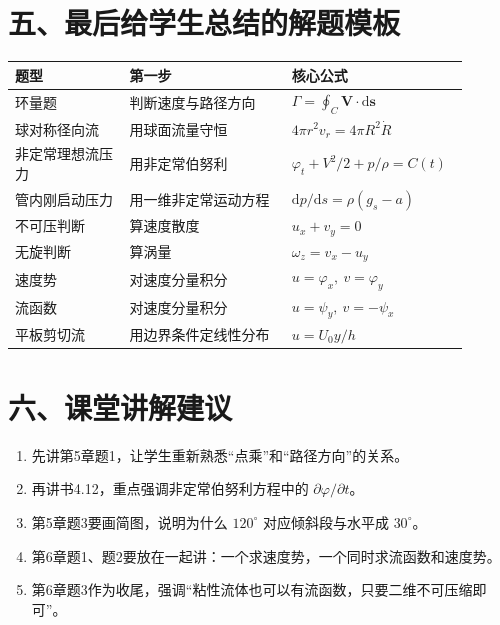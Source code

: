 ﻿\documentclass[12pt,a4paper]{ctexart}
\newcommand{\dd}{\mathrm d}
\begin{document}
\section*{五、最后给学生总结的解题模板}

\begin{center}
\begin{tabular}{p{0.24\linewidth}p{0.34\linewidth}p{0.32\linewidth}}
\toprule
题型 & 第一步 & 核心公式 \\
\midrule
环量题 & 判断速度与路径方向 & $\Gamma=\oint_C\bm V\cdot\dd\bm s$ \\
球对称径向流 & 用球面流量守恒 & $4\pi r^2v_r=4\pi R^2\dot R$ \\
非定常理想流压力 & 用非定常伯努利 & $\varphi_t+V^2/2+p/\rho=C(t)$ \\
管内刚启动压力 & 用一维非定常运动方程 & $\dd p/\dd s=\rho(g_s-a)$ \\
不可压判断 & 算速度散度 & $u_x+v_y=0$ \\
无旋判断 & 算涡量 & $\omega_z=v_x-u_y$ \\
速度势 & 对速度分量积分 & $u=\varphi_x,\ v=\varphi_y$ \\
流函数 & 对速度分量积分 & $u=\psi_y,\ v=-\psi_x$ \\
平板剪切流 & 用边界条件定线性分布 & $u=U_0y/h$ \\
\bottomrule
\end{tabular}
\end{center}

\section*{六、课堂讲解建议}

\begin{enumerate}
  \item 先讲第5章题1，让学生重新熟悉“点乘”和“路径方向”的关系。
  \item 再讲书4.12，重点强调非定常伯努利方程中的 $\partial\varphi/\partial t$。
  \item 第5章题3要画简图，说明为什么 $120^\circ$ 对应倾斜段与水平成 $30^\circ$。
  \item 第6章题1、题2要放在一起讲：一个求速度势，一个同时求流函数和速度势。
  \item 第6章题3作为收尾，强调“粘性流体也可以有流函数，只要二维不可压缩即可”。
\end{enumerate}
\end{document}
